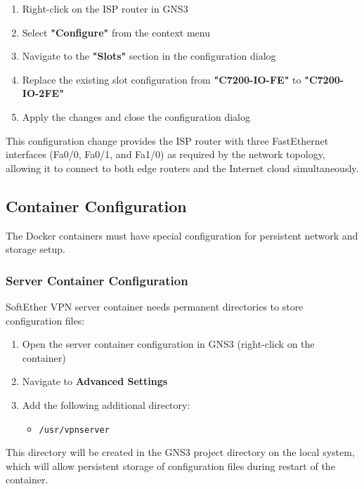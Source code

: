\begin{enumerate}
    \item Right-click on the ISP router in GNS3
    \item Select \textbf{"Configure"} from the context menu
    \item Navigate to the \textbf{"Slots"} section in the configuration dialog
    \item Replace the existing slot configuration from \textbf{"C7200-IO-FE"} to \textbf{"C7200-IO-2FE"}
    \item Apply the changes and close the configuration dialog
\end{enumerate}

This configuration change provides the ISP router with three FastEthernet interfaces (Fa0/0, Fa0/1, and Fa1/0) as required by the network topology, allowing it to connect to both edge routers and the Internet cloud simultaneously.

\subsection{Container Configuration}

The Docker containers must have special configuration for persistent network and storage setup.

\subsubsection{Server Container Configuration}

SoftEther VPN server container needs permanent directories to store configuration files:

\begin{enumerate}
    \item Open the server container configuration in GNS3 (right-click on the container)
    \item Navigate to \textbf{Advanced Settings}
    \item Add the following additional directory:
    \begin{itemize}
        \item \texttt{/usr/vpnserver}
    \end{itemize}
\end{enumerate}

\noindent
This directory will be created in the GNS3 project directory on the local system, which will allow persistent storage of configuration files during restart of the container.

